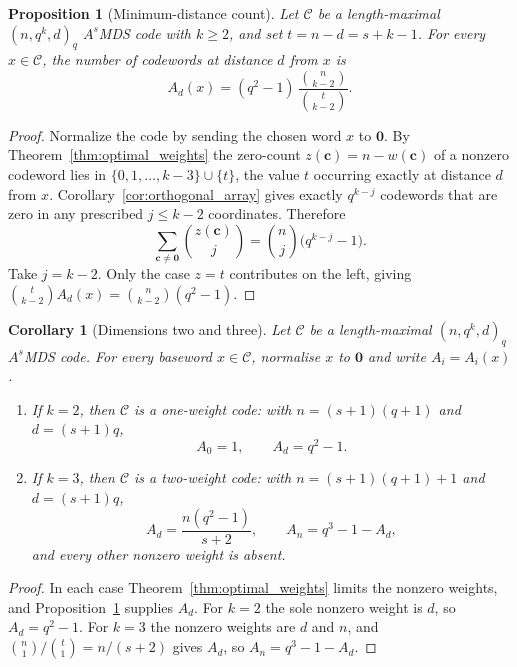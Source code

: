 \documentclass[12pt, letterpaper]{article}
\theoremstyle{plain}
\newtheorem{proposition}[theorem]{Proposition}
\newtheorem{corollary}[theorem]{Corollary}
\theoremstyle{definition}
\begin{document}
	\begin{proposition}[Minimum-distance count]\label{prop:min_weight_count}
		Let $\mathcal{C}$ be a length-maximal $(n, q^k, d)_q$ $A^s$MDS code with $k \ge 2$, and set $t = n-d = s+k-1$. For every $x\in\mathcal C$, the number of codewords at distance $d$ from $x$ is
		\[
		A_d(x) = (q^2-1)\,\frac{\binom{n}{k-2}}{\binom{t}{k-2}}.
		\]
	\end{proposition}

	\begin{proof}
		Normalize the code by sending the chosen word $x$ to $\mathbf0$. By Theorem~\ref{thm:optimal_weights} the zero-count $z(\mathbf c) = n-w(\mathbf c)$ of a nonzero codeword lies in $\{0,1,\dots,k-3\}\cup\{t\}$, the value $t$ occurring exactly at distance $d$ from $x$. Corollary~\ref{cor:orthogonal_array} gives exactly $q^{k-j}$ codewords that are zero in any prescribed $j\le k-2$ coordinates. Therefore
		\[
		\sum_{\mathbf c \ne \mathbf 0} \binom{z(\mathbf c)}{j} = \binom{n}{j}\bigl(q^{k-j}-1\bigr).
		\]
		Take $j=k-2$. Only the case $z=t$ contributes on the left, giving $\binom{t}{k-2}A_d(x)=\binom{n}{k-2}(q^2-1)$.
	\end{proof}

	\begin{corollary}[Dimensions two and three]\label{cor:dim23_enumerator}
		Let $\mathcal{C}$ be a length-maximal $(n, q^k, d)_q$ $A^s$MDS code. For every baseword $x\in\mathcal C$, normalise $x$ to $\mathbf0$ and write $A_i=A_i(x)$.
		\begin{enumerate}
			\item If $k = 2$, then $\mathcal{C}$ is a one-weight code: with $n = (s+1)(q+1)$ and $d = (s+1)q$,
			\[
			A_0 = 1, \qquad A_d = q^2 - 1.
			\]
			\item If $k = 3$, then $\mathcal{C}$ is a two-weight code: with $n = (s+1)(q+1)+1$ and $d = (s+1)q$,
			\[
			A_d = \frac{n(q^2-1)}{s+2}, \qquad A_n = q^3 - 1 - A_d,
			\]
			and every other nonzero weight is absent.
		\end{enumerate}
	\end{corollary}

	\begin{proof}
		In each case Theorem~\ref{thm:optimal_weights} limits the nonzero weights, and Proposition~\ref{prop:min_weight_count} supplies $A_d$. For $k = 2$ the sole nonzero weight is $d$, so $A_d = q^2-1$. For $k = 3$ the nonzero weights are $d$ and $n$, and $\binom{n}{1}/\binom{t}{1} = n/(s+2)$ gives $A_d$, so   $A_n = q^3 - 1 - A_d$.
	\end{proof}
\end{document}

